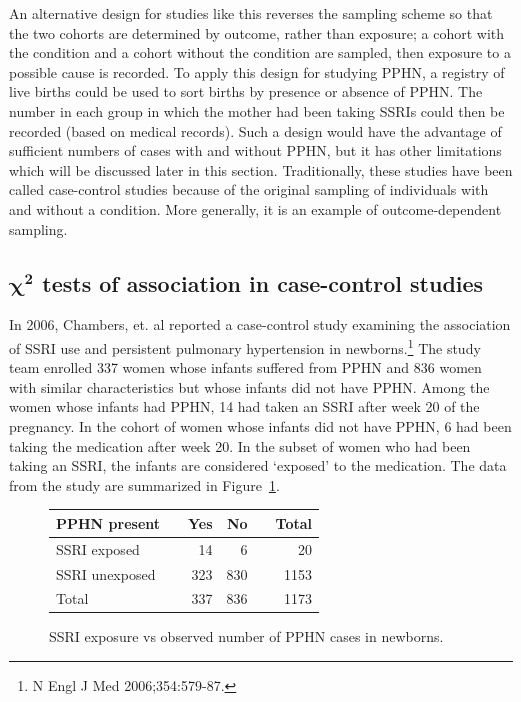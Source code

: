 
An alternative design for studies like this reverses the sampling scheme so that the two cohorts are determined by outcome, rather than exposure; a cohort with the condition and a cohort without the condition are sampled, then exposure to a possible cause is recorded. To apply this design for studying PPHN, a registry of live births could be used to sort births by presence or absence of PPHN. The number in each group in which the mother had been taking SSRIs could then be recorded (based on medical records). Such a design would have the advantage of sufficient numbers of cases with and without PPHN, but it has other limitations which will be discussed later in this section. Traditionally, these studies have been called case-control studies because of the original sampling of individuals with and without a condition.  More generally, it is an example of outcome-dependent sampling. 


\textD{\newpage}


\subsection{$\pmb{\chi^2}$ tests of association in case-control studies}
\label{caseControlTests}


In 2006, Chambers, et. al reported a case-control study examining the association of SSRI use and persistent pulmonary hypertension in newborns.\footnote{N Engl J Med 2006;354:579-87.}  The study team enrolled 337 women whose infants suffered from PPHN and 836 women with similar characteristics but whose infants did not have PPHN.  Among the women whose infants had PPHN, 14 had taken an SSRI after week 20 of the pregnancy.  In the cohort of women whose infants did not have PPHN, 6 had been taking the medication after week 20. In the subset of women who had been taking an SSRI, the infants are considered `exposed' to the medication. The data from the study are summarized in Figure~\ref{ssriPPHNObserved}.

\begin{figure}[h]
	\centering
	\begin{tabular}{ll rrr r}
		\hline
		PPHN present	 & \hspace{2mm} & Yes & No & \hspace{2mm} & Total \\
		\hline
		SSRI exposed &	& 14 & 6 &  & 20  \\
		SSRI unexposed & & 323 & 830 &  & 1153  \\
        Total & & 337 & 836 & & 1173 \\
		\hline
	\end{tabular}
	\caption{SSRI exposure vs observed number of PPHN cases in newborns.}
    \label{ssriPPHNObserved}
\end{figure}	

